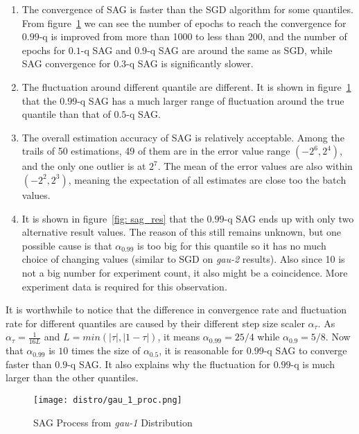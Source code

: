 \begin{enumerate}
    \item The convergence of SAG is faster than the SGD algorithm for some quantiles. From figure~\ref{fig: sag_proc} we can see the number of epochs to reach the convergence for $0.99$-q is improved from more than 1000 to less than 200, and the number of epochs for $0.1$-q SAG and $0.9$-q SAG are around the same as SGD, while SAG convergence for $0.3$-q SAG is significantly slower.
    \item The fluctuation around different quantile are different. It is shown in figure~\ref{fig: sag_proc} that the $0.99$-q SAG has a much larger range of fluctuation around the true quantile than that of $0.5$-q SAG.
    \item The overall estimation accuracy of SAG is relatively acceptable. Among the trails of 50 estimations, 49 of them are in the error value range $(-2^6, 2^4)$, and the only one outlier is at $2^7$. The mean of the error values are also within $(-2^2, 2^3)$, meaning the expectation of all estimates are close too the batch values.
    \item It is shown in figure~\ref{fig: sag_res} that the $0.99$-q SAG ends up with only two alternative result values. The reason of this still remains unknown, but one possible cause is that $\alpha_{0.99}$ is too big for this quantile so it has no much choice of changing values (similar to SGD on \textit{gau-2} results). Also since 10 is not a big number for experiment count, it also might be a coincidence. More experiment data is required for this observation.
\end{enumerate}

It is worthwhile to notice that the difference in convergence rate and fluctuation rate for different quantiles are caused by their different step size scaler $\alpha_\tau$. As $\alpha_\tau =\frac{1}{16L}$ and $L = min(|\tau|, |1-\tau|)$, it means $\alpha_{0.99} = 25/4$ while $\alpha_{0.9} = 5/8$. Now that $\alpha_{0.99}$ is $10$ times the size of $\alpha_{0.5}$, it is reasonable for $0.99$-q SAG to converge faster than $0.9$-q SAG. It also explains why the fluctuation for $0.99$-q is much larger than the other quantiles.

\graphicspath{{Figures/Stepsize_adapt/SAG/}{./}} 

\begin{figure}[H]
    \centering
	\texttt{[image: distro/gau\_1\_proc.png]}
    \caption{SAG Process from \textit{gau-1} Distribution}
    \label{fig: sag_proc}
\end{figure}

